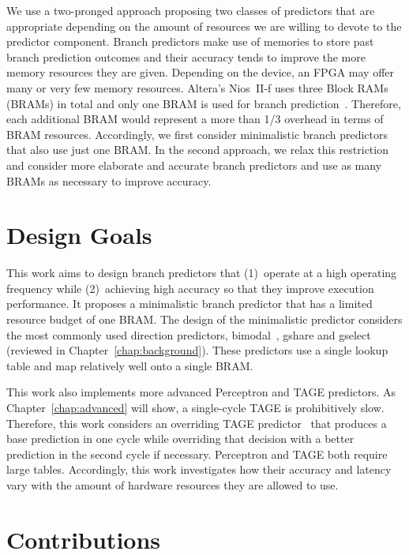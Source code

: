 We use a two-pronged approach proposing two classes of predictors that are appropriate depending on the amount of resources we are willing to devote to the predictor component. Branch predictors make use of memories to store past branch prediction outcomes and their accuracy tends to improve the more memory resources they are given. Depending on the device, an FPGA may offer many or very few memory resources. Altera's Nios~II-f uses three Block RAMs (BRAMs) in total and only one BRAM is used for branch prediction~\cite{niosiif}. Therefore, each additional BRAM would represent a more than 1/3 overhead in terms of BRAM resources. Accordingly, we first consider minimalistic branch predictors that also use just one BRAM. In the second approach, we relax this restriction and consider more elaborate and accurate branch predictors and use as many BRAMs as necessary to improve accuracy.

\section{Design Goals}
\label{sec:introduction:goal}

This work aims to design branch predictors that (1)~operate at a high operating frequency while (2)~achieving high accuracy so that they improve execution performance. It proposes a minimalistic branch predictor that has a limited resource budget of one BRAM. The design of the minimalistic predictor considers the most commonly used direction predictors, bimodal~\cite{bimodal}, gshare and gselect~\cite{McFarling} (reviewed in Chapter~\ref{chap:background}). These predictors use a single lookup table and map relatively well onto a single BRAM.

This work also implements more advanced Perceptron and TAGE predictors. As Chapter~\ref{chap:advanced} will show, a single-cycle TAGE is prohibitively slow. Therefore, this work considers an overriding TAGE predictor~\cite{override} that produces a base prediction in one cycle while overriding that decision with a better prediction in the second cycle if necessary. Perceptron and TAGE both require large tables. Accordingly, this work investigates how their accuracy and latency vary with the amount of hardware resources they are allowed to use.


\section{Contributions}
\label{sec:intro:contributions}

